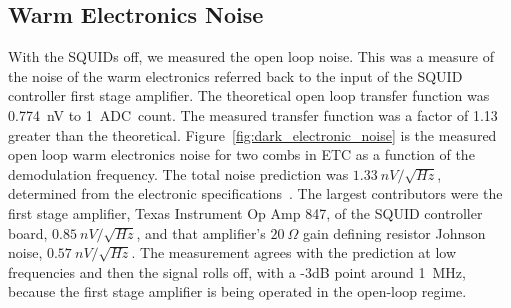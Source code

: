 


\subsection{Warm Electronics Noise}
\label{sec:warm_electronics}


With the \ac{SQUID}s off, we measured the open loop noise.
This was a measure of the noise of the warm electronics referred back to the input of the \ac{SQUID} controller first stage amplifier. 
The theoretical open loop transfer function was 0.774~nV to 1~\ac{ADC}~count. 
The measured transfer function was a factor of 1.13 greater than the theoretical. 
Figure~\ref{fig:dark_electronic_noise} is the measured open loop warm electronics noise for two combs in \ac{ETC} as a function of the demodulation frequency. 
The total noise prediction was $1.33~nV/\sqrt{Hz}$, determined from the electronic specifications~\cite{Francois2012}. 
The largest contributors were the first stage amplifier, Texas Instrument Op Amp 847, of the \ac{SQUID} controller board, $0.85~nV/\sqrt{Hz}$, and that amplifier's $20~\Omega$ gain defining resistor Johnson noise, $0.57~nV/\sqrt{Hz}$. 
The measurement agrees with the prediction at low frequencies and then the signal rolls off, with a -3dB point around 1~MHz, because the first stage amplifier is being operated in the open-loop regime.


